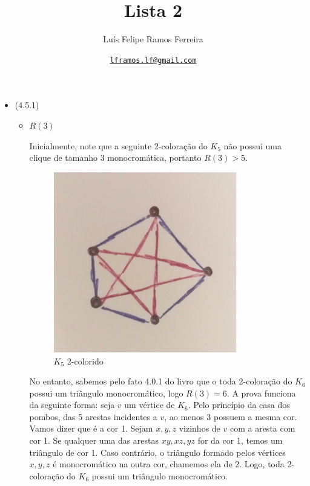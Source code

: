 \documentclass{article}
\title{Lista 2}
\author{Luís Felipe Ramos Ferreira}
\date{\href{mailto:lframos.lf@gmail.com}{\texttt{lframos.lf@gmail.com}}
}
\begin{document}
\maketitle

\begin{itemize}
	\item (4.5.1)
		\begin{itemize}
			\item \(R(3)\)

				Inicialmente, note que a seguinte 2-coloração do \(K_5\) não possui uma clique de tamanho 3 monocromática, portanto
				\(R(3) > 5\). 

			                  \begin{figure}[H]
				                  \centering
				                  \includegraphics[width=0.8\textwidth]{images/1a.jpeg}
								  \caption{\(K_5\) 2-colorido}
			                  \end{figure}

				No entanto, sabemos pelo fato 4.0.1 do livro que o toda 2-coloração do \(K_6\) possui um triângulo monocromático, logo \(R(3) = 6\).
				A prova funciona da seguinte forma: seja \(v\) um vértice de \(K_6\). Pelo princípio da casa dos pombos, das 5 arestas incidentes a \(v\),
				ao menos 3 possuem a mesma cor. Vamos dizer que é a cor 1. Sejam \(x, y, z\) vizinhos de \(v\) com a aresta com cor 1. Se qualquer uma das arestas
				\(xy, xz, yz\) for da cor 1, temos um triângulo de cor 1. Caso contrário, o triângulo formado pelos vértices \(x, y, z\) é monocromático na outra cor,
				chamemos ela de 2. Logo, toda 2-coloração do \(K_6\) possui um triângulo monocromático.


\end{itemize}
\end{itemize}
\end{document}
